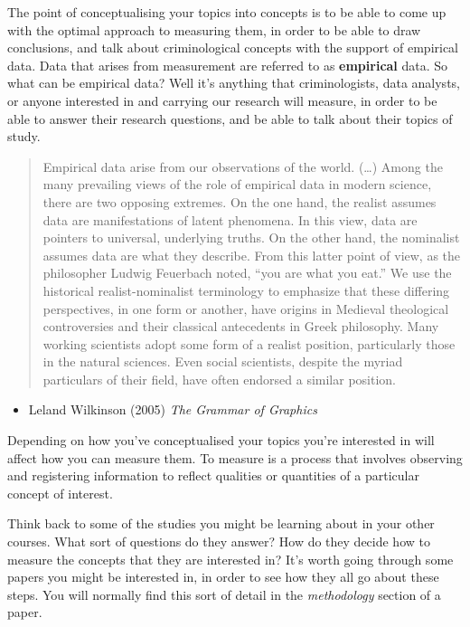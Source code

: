 \documentclass[]{book}
\providecommand{\tightlist}{%
  \setlength{\itemsep}{0pt}\setlength{\parskip}{0pt}}
\theoremstyle{definition}
\theoremstyle{definition}
\theoremstyle{definition}
\theoremstyle{remark}
\begin{document}
The point of conceptualising your topics into concepts is to be able to
come up with the optimal approach to measuring them, in order to be able
to draw conclusions, and talk about criminological concepts with the
support of empirical data. Data that arises from measurement are
referred to as \textbf{empirical} data. So what can be empirical data?
Well it's anything that criminologists, data analysts, or anyone
interested in and carrying our research will measure, in order to be
able to answer their research questions, and be able to talk about their
topics of study.

\begin{quote}
Empirical data arise from our observations of the world. (\ldots{})
Among the many prevailing views of the role of empirical data in modern
science, there are two opposing extremes. On the one hand, the realist
assumes data are manifestations of latent phenomena. In this view, data
are pointers to universal, underlying truths. On the other hand, the
nominalist assumes data are what they describe. From this latter point
of view, as the philosopher Ludwig Feuerbach noted, ``you are what you
eat.'' We use the historical realist-nominalist terminology to emphasize
that these differing perspectives, in one form or another, have origins
in Medieval theological controversies and their classical antecedents in
Greek philosophy. Many working scientists adopt some form of a realist
position, particularly those in the natural sciences. Even social
scientists, despite the myriad particulars of their field, have often
endorsed a similar position.
\end{quote}

\begin{itemize}
\tightlist
\item
  Leland Wilkinson (2005) \emph{The Grammar of Graphics}
\end{itemize}

Depending on how you've conceptualised your topics you're interested in
will affect how you can measure them. To measure is a process that
involves observing and registering information to reflect qualities or
quantities of a particular concept of interest.

Think back to some of the studies you might be learning about in your
other courses. What sort of questions do they answer? How do they decide
how to measure the concepts that they are interested in? It's worth
going through some papers you might be interested in, in order to see
how they all go about these steps. You will normally find this sort of
detail in the \emph{methodology} section of a paper.
\end{document}
